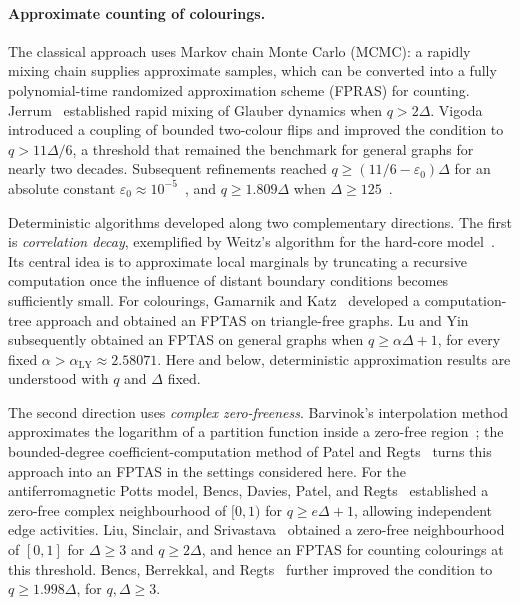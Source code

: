 \documentclass[11pt,reqno]{article}
\theoremstyle{plain}
\theoremstyle{definition}
\theoremstyle{remark}
\theoremstyle{definition}
\theoremstyle{remark}
\newcommand{\Deg}{\Delta}                        %
\begin{document}
\paragraph{Approximate counting of colourings.}
The classical approach uses Markov chain Monte Carlo (MCMC): a rapidly
mixing chain supplies approximate samples, which can be converted into a
fully polynomial-time randomized approximation scheme (FPRAS) for
counting.  Jerrum~\cite{Jerrum1995} established rapid mixing of Glauber
dynamics when \(q>2\Deg\).  Vigoda~\cite{Vigoda2000} introduced a coupling
of bounded two-colour flips and improved the condition to
\(q>11\Deg/6\), a threshold that remained the benchmark for general
graphs for nearly two decades.  Subsequent refinements reached
\(q\ge(11/6-\varepsilon_0)\Deg\) for an absolute constant
\(\varepsilon_0\approx10^{-5}\)~\cite{CDMPP2019},
and \(q\ge1.809\Deg\) when \(\Deg\ge125\)~\cite{CarlsonVigoda2024}.

Deterministic algorithms developed along two complementary directions.
The first is \emph{correlation decay}, exemplified by Weitz's algorithm
for the hard-core model~\cite{Weitz2006}.  Its central idea is to
approximate local marginals by truncating a recursive computation once
the influence of distant boundary conditions becomes sufficiently small.
For colourings, Gamarnik and Katz~\cite{GamarnikKatz2012} developed a
computation-tree approach and obtained an FPTAS on triangle-free graphs.
Lu and Yin~\cite{LuYin2013} subsequently obtained an FPTAS on general
graphs when \(q\ge\alpha\Deg+1\), for every fixed
\(\alpha>\alpha_{\mathrm{LY}}\approx2.58071\).
Here and below, deterministic approximation results are understood with
\(q\) and \(\Deg\) fixed.

The second direction uses \emph{complex zero-freeness}.  Barvinok's
interpolation method approximates the logarithm of a partition function
inside a zero-free region~\cite{Barvinok2016}; the bounded-degree
coefficient-computation method of Patel and Regts~\cite{PatelRegts2017}
turns this approach into an FPTAS in the settings considered here.
For the antiferromagnetic Potts model, Bencs, Davies, Patel, and
Regts~\cite{BencsDaviesPatelRegts2021} established a zero-free complex
neighbourhood of \([0,1)\) for \(q\ge e\Deg+1\), allowing independent
edge activities.  Liu, Sinclair, and
Srivastava~\cite{LiuSinclairSrivastava2025} obtained a zero-free
neighbourhood of \([0,1]\) for \(\Deg\ge3\) and \(q\ge2\Deg\), and
hence an FPTAS for counting colourings at this threshold.
Bencs, Berrekkal, and Regts~\cite{BencsBerrekkalRegts2026} further
improved the condition to \(q\ge1.998\Deg\), for \(q,\Deg\ge3\).
\end{document}
